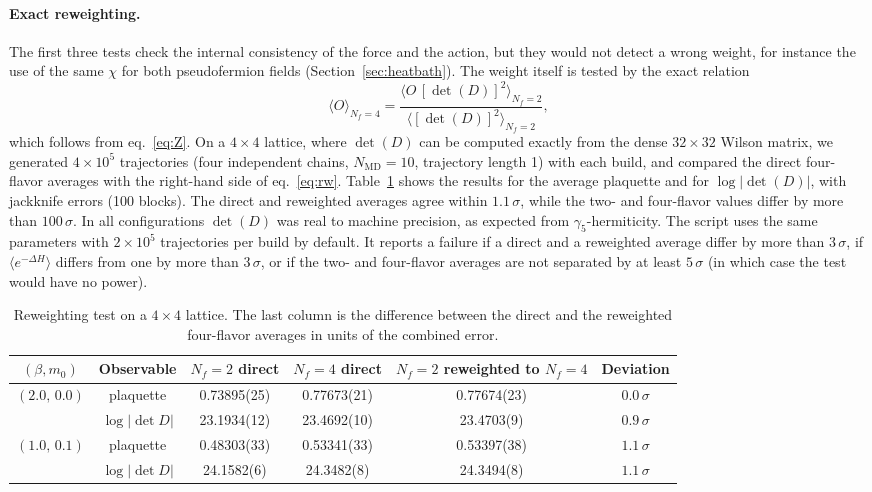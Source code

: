 \documentclass[11pt,a4paper]{article}
\newcommand{\Nf}{N_f}
\newcommand{\NMD}{N_{\mathrm{MD}}}
\begin{document}
\paragraph{Exact reweighting.}
The first three tests check the internal consistency of the force and the action, but they would not detect a wrong
weight, for instance the use of the same $\chi$ for both pseudofermion fields (Section~\ref{sec:heatbath}). The
weight itself is tested by the exact relation
\begin{equation}
    \langle O\rangle_{\Nf=4} = \frac{\bigl\langle O\,[\det(D)]^2\bigr\rangle_{\Nf=2}}{\bigl\langle [\det(D)]^2\bigr\rangle_{\Nf=2}},
    \label{eq:rw}
\end{equation}
which follows from eq.~\eqref{eq:Z}. On a $4\times4$ lattice, where $\det(D)$ can be computed exactly from the dense
$32\times32$ Wilson matrix, we generated $4\times10^5$ trajectories (four independent chains, $\NMD = 10$, trajectory
length 1) with each build, and compared the direct four-flavor averages with the right-hand side of
eq.~\eqref{eq:rw}. Table~\ref{tab:rw} shows the results for the average plaquette and for $\log|\det(D)|$, with
jackknife errors (100 blocks). The direct and reweighted averages agree within $1.1\,\sigma$, while the two- and
four-flavor values differ by more than $100\,\sigma$. In all configurations $\det(D)$ was real to machine precision,
as expected from $\gamma_5$-hermiticity. The script uses the same parameters with $2\times10^5$ trajectories per
build by default. It reports a failure if a direct and a reweighted average differ by more than $3\,\sigma$, if
$\langle e^{-\Delta H}\rangle$ differs from one by more than $3\,\sigma$, or if the two- and four-flavor averages are
not separated by at least $5\,\sigma$ (in which case the test would have no power).

\begin{table}[h]
\centering
\small
\begin{tabular}{cccccc}
\toprule
$(\beta, m_0)$ & Observable & $\Nf=2$ direct & $\Nf=4$ direct & $\Nf=2$ reweighted to $\Nf=4$ & Deviation \\
\midrule
$(2.0,\,0.0)$ & plaquette       & 0.73895(25) & 0.77673(21) & 0.77674(23) & $0.0\,\sigma$ \\
              & $\log|\det D|$  & 23.1934(12) & 23.4692(10) & 23.4703(9)  & $0.9\,\sigma$ \\
$(1.0,\,0.1)$ & plaquette       & 0.48303(33) & 0.53341(33) & 0.53397(38) & $1.1\,\sigma$ \\
              & $\log|\det D|$  & 24.1582(6)  & 24.3482(8)  & 24.3494(8)  & $1.1\,\sigma$ \\
\bottomrule
\end{tabular}
\caption{Reweighting test on a $4\times4$ lattice. The last column is the difference between the direct and the
reweighted four-flavor averages in units of the combined error.}
\label{tab:rw}
\end{table}
\end{document}
